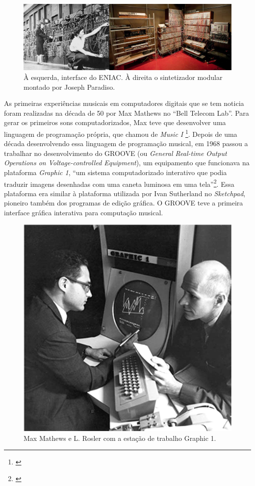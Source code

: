 \begin{figure}
    \caption{\label{analogicos}À esquerda, interface do ENIAC.  À direita o sintetizador modular montado por Joseph Paradiso. }
    
    \includegraphics[width=1\linewidth]{pictures/analogicos}
    
\end{figure}

As primeiras experiências musicais em computadores digitais que se tem noticia foram realizadas na década de 50 por Max Mathews no ``Bell Telecom Lab''. Para gerar os primeiros sons computadorizados, Max teve que desenvolver uma linguagem de programação própria, que chamou de \emph{Music I} \footnote{\cite[p. 253]{Holmes1985}}. Depois de uma década desenvolvendo essa linguagem de programação musical, em 1968 passou a trabalhar no desenvolvimento do GROOVE (ou \emph{General Real-time Output Operations on Voltage-controlled Equipment}), um equipamento que funcionava na plataforma \emph{Graphic 1}, ``um sistema computadorizado interativo que podia traduzir imagens desenhadas com uma caneta luminosa em uma tela''\footnote{\cite[p. 253]{Holmes1985}}. Essa plataforma era similar à plataforma utilizada por Ivan Sutherland no \emph{Sketchpad}, pioneiro também dos programas de edição gráfica. O GROOVE teve a primeira interface gráfica interativa para computação musical. 

\begin{figure}
    \caption{\label{max}Max Mathews e L. Rosler com a estação de trabalho Graphic 1. }
    
        \includegraphics[width=0.5\linewidth]{pictures/MaxHolmes-251}
    
\end{figure}

